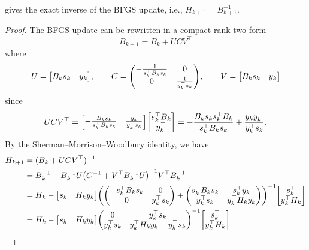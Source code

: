 \documentclass[0_en]{subfiles}
\begin{document}
\begin{proposition}
     gives the exact inverse of the BFGS update, i.e., $H_{k+1} = B_{k+1}^{-1}$.
\end{proposition}
\begin{proof}
    The BFGS update can be rewritten in a compact rank-two form
    \begin{equation}\label{eq:bfgs-ucv}
        B_{k+1} = B_k + UCV^\top
    \end{equation}
    where
    \begin{equation*}
        U = \mqty[B_k s_k & y_k],\qquad
        C = \mqty(-\frac{1}{s_k^\top B_k s_k} & 0 \\ 0 & \frac{1}{y_k^\top s_k}),\qquad
        V = \mqty[B_k s_k & y_k]
    \end{equation*}
    since
    \begin{equation}
        U C V^\top   = \mqty[ -\frac{B_k s_k}{s_k^\top B_k s_k}&    \frac{y_k}{y_k^\top s_k} ] \mqty[ s_k^\top B_k  \\  y_k^\top ]
        = -\frac{B_k s_k s_k^\top B_k}{s_k^\top B_k s_k} + \frac{y_k y_k^\top}{y_k^\top s_k}.
    \end{equation}
    By the Sherman--Morrison--Woodbury identity, we have
    \begin{align*}
        H_{k+1} & = (B_k + U C V^\top)^{-1}                                                                                                                                                                                                                    \\
                & = B_k^{-1}- B_k^{-1}U\qty(C^{-1}+V^\top B_k^{-1}U)^{-1}V^\top B_k^{-1}                                                                                                                                                                       \\
                & = H_k- \mqty[s_k                                                                                                                             & H_k y_k]\qty(\mqty(- s_k^\top B_k s_k                                         & 0             \\0    & y_k^\top s_k)+\mqty(s_k^\top B_k s_k   & s_k^\top y_k      \\y_k^\top s_k & y_k^\top H_k y_k))^{-1}\mqty[s_k^\top   \\ y_k^\top H_k] \\
                & = H_k- \mqty[s_k                                                                                                                             & H_k y_k]\mqty(0                                                               & y_k^\top s_k  \\y_k^\top s_k       & y_k^\top H_k y_k + y_k^\top s_k)^{-1}\mqty[s_k^\top                         \\     y_k^\top H_k]                 \\

\end{align*}
\end{proof}
\end{document}
